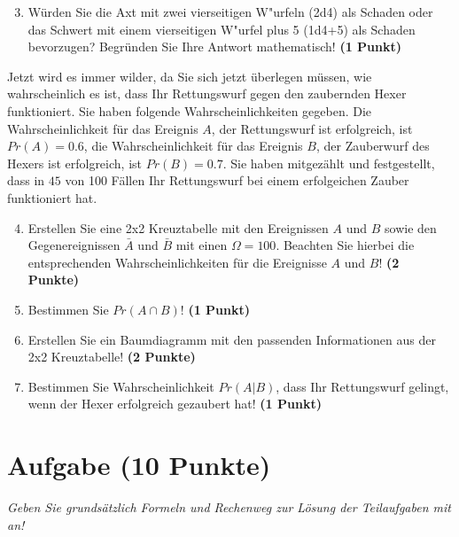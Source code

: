 \documentclass[a4paper, 10pt]{scrartcl}\usepackage[]{graphicx}\usepackage[]{xcolor}
\begin{document}
\begin{enumerate}
  \setcounter{enumi}{2}
\item W{\"u}rden Sie die Axt mit zwei vierseitigen W{"u}rfeln (2d4) als Schaden oder
  das Schwert mit einem vierseitigen W{"u}rfel plus 5 (1d4+5) als Schaden bevorzugen?
  Begr{\"u}nden Sie Ihre Antwort mathematisch! \textbf{(1 Punkt)}
\end{enumerate}

Jetzt wird es immer wilder, da Sie sich jetzt {\"u}berlegen m{\"u}ssen, wie
wahrscheinlich es ist, dass Ihr Rettungswurf gegen den zaubernden Hexer
funktioniert. Sie haben folgende Wahrscheinlichkeiten gegeben. Die
Wahrscheinlichkeit f{\"u}r das Ereignis $A$, der Rettungswurf ist erfolgreich,
ist $Pr(A) = 0.6$, die Wahrscheinlichkeit f{\"u}r das Ereignis $B$,
der Zauberwurf des Hexers ist erfolgreich, ist $Pr(B) = 0.7$. Sie
haben mitgez{\"a}hlt und festgestellt, dass in $45$ von 100 F{\"a}llen
Ihr Rettungswurf bei einem erfolgeichen Zauber funktioniert hat.  

\begin{enumerate}
  \setcounter{enumi}{3}
\item Erstellen Sie eine 2x2 Kreuztabelle mit den Ereignissen $A$ und $B$
  sowie den Gegenereignissen $\bar{A}$ und $\bar{B}$ mit einen
  $\Omega = 100$. Beachten Sie hierbei die entsprechenden
  Wahrscheinlichkeiten f{\"u}r die Ereignisse $A$ und $B$! \textbf{(2 Punkte)}
\item Bestimmen Sie $Pr(A \cap B)$! \textbf{(1 Punkt)}
\item Erstellen Sie ein Baumdiagramm mit den passenden Informationen aus der 2x2
  Kreuztabelle! \textbf{(2 Punkte)}
\item Bestimmen Sie Wahrscheinlichkeit $Pr(A|B)$, dass Ihr Rettungswurf gelingt, wenn
  der Hexer erfolgreich gezaubert hat! \textbf{(1 Punkt)}
\end{enumerate}

 
\clearpage\null 
\clearpage

\section{Aufgabe \hfill (10 Punkte)}

\textit{Geben Sie grunds{\"a}tzlich Formeln und Rechenweg zur L{\"o}sung der
  Teilaufgaben mit an!} \\[1Ex]
\end{document}
